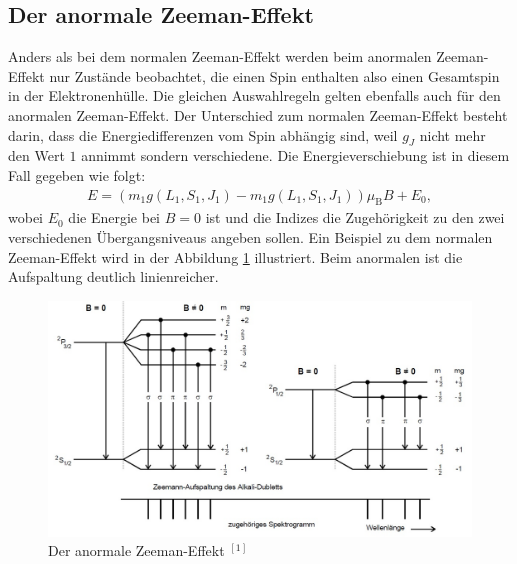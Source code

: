 \documentclass{article}
\begin{document}
	\subsection{Der anormale Zeeman-Effekt}
	Anders als bei dem normalen Zeeman-Effekt werden beim anormalen Zeeman-Effekt nur Zustände beobachtet, die einen Spin enthalten also einen Gesamtspin in der Elektronenhülle. Die gleichen Auswahlregeln gelten ebenfalls auch für den anormalen Zeeman-Effekt. Der Unterschied zum normalen Zeeman-Effekt besteht darin, dass die Energiedifferenzen vom Spin abhängig sind, weil $g_J$ nicht mehr den Wert $1$ annimmt sondern verschiedene. Die Energieverschiebung ist in diesem Fall gegeben wie folgt:
	\begin{align}
	E=(m_1g(L_1,S_1,J_1)-m_1g(L_1,S_1,J_1))\mu_\text{B}B+E_0, \label{eqn:Eanomal}
	\end{align}
	wobei $E_0$ die Energie bei $B=0$ ist und die Indizes die Zugehörigkeit zu den zwei verschiedenen Übergangsniveaus angeben sollen. Ein Beispiel zu dem normalen Zeeman-Effekt wird in der Abbildung \ref{fig:anormalerzeemaneffekt} illustriert. Beim anormalen ist die Aufspaltung deutlich linienreicher.
	\begin{figure}[h!]
		\centering
		\includegraphics[width=0.9\linewidth]{AnormalerZeemanEffekt.jpg}
		\caption{Der anormale Zeeman-Effekt $^{[1]}$}
		\label{fig:anormalerzeemaneffekt}
	\end{figure}
	
	
\end{document}

